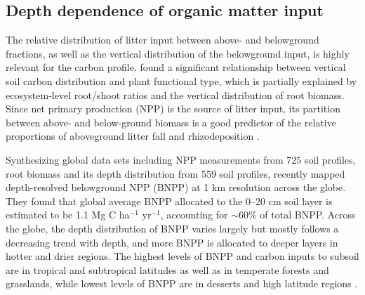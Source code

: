 \documentclass[11pt, oneside, a4paper]{article}   	%
\begin{document}
\subsection{Depth dependence of organic matter input}
The relative distribution of litter input between above- and belowground fractions,
as well as the vertical distribution of the belowground input, is highly relevant for the
carbon profile. \citet{Jobbagy2000} found a significant relationship between
vertical soil carbon distribution and plant functional type, which is partially explained by
ecosystem-level root/shoot ratios and the vertical distribution of root biomass.
Since net primary production (NPP) is the source of litter input, its partition between above- and below-ground biomass is a good predictor of the relative proportions of aboveground litter
fall and rhizodeposition \citep{Raich1989, Xiao2023}. 

Synthesizing global data sets including NPP measurements from 725 soil profiles, root biomass and its depth distribution from 559 soil profiles, \citet{Xiao2023} recently mapped depth-resolved belowground NPP (BNPP) at 1 km resolution across the globe. They found that global average BNPP allocated to the 0–20 cm soil layer is estimated to be 1.1 Mg C ha$^{-1}$ yr$^{-1}$, accounting for $\sim$60\% of total BNPP. Across the globe, the depth distribution of BNPP varies largely but mostly follows a decreasing trend with depth, and more BNPP is allocated to deeper layers in hotter and drier regions. 
The highest levels of BNPP and carbon inputs to subsoil are in tropical and subtropical latitudes as well as in temperate forests and grasslands, while lowest levels of BNPP are in desserts and high latitude regions \citep{Xiao2023}. 
\end{document}

